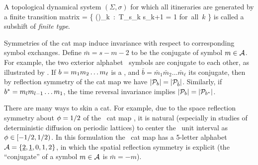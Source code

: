 A {topological dynamical system} $(\Sigma,\sigma)$ for
which all {\admissible} itineraries are generated by a finite
transition matrix
\beq
\Sigma = \left\{ ()_{k\in \integers} \,:\, T_{s_k s_{k+1}} = 1
        \quad \mbox{for all $k$} \right\}
is called a subshift of {\em finite type}.

Symmetries of the cat map induce  invariance with respect to
corresponding symbol exchanges. Define $\bar{m}=s\!-\!m\!-\!2$ to be the
conjugate of symbol $m \in \mathcal{A}$. For example, the two exterior
alphabet \Ae\ symbols are conjugate to each other, as illustrated by
.
If ${b}={m_{1}} {m_{2}} \dots {\ensuremath{m_{\ell}}}$ is a
\brick, and  $\bar{{b}}=\bar{m}_1 \bar{m}_2 \dots
\bar{m}_\ell$ its conjugate, then by  reflection symmetry of the cat
map we have  $|\mathcal{P}_{{b}}|= |\mathcal{P}_{\bar{{b}}}|$. Similarly, if
$b^*={m_{l}}{m_{l-1}}\dots {\ensuremath{m_{1}}}$, the time reversal invariance implies
$|\mathcal{P}_{{b}}|=|\mathcal{P}_{{b}^*}|$.

There are many ways to skin a cat. For example, due to the space
reflection symmetry about $\phi=1/2$ of the \PV\ cat map
, it is natural (especially in studies of
deterministic diffusion on periodic
lattices) to center  the \statesp\
unit interval as $\phi\in[-1/2,1/2)$. In this formulation the
\PV\  cat map has a 5-letter alphabet
$\mathcal{A}=\{\underline{2},\underline{1},0,1,2\}$, in which the spatial
reflection symmetry is explicit (the ``conjugate'' of a symbol $m \in \mathcal{A}$
is $\bar{m}= -\!m$).

